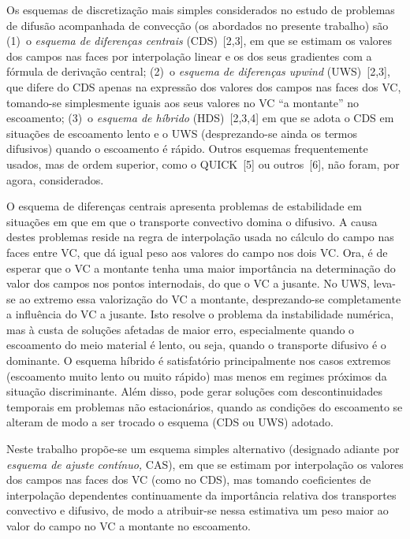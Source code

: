 \documentclass[11pt,twoside]{article}
\begin{document}
{Os esquemas de discretização mais simples considerados no estudo de problemas de
difusão acompanhada de convecção (os abordados no presente trabalho) são (1)~o
\emph{esquema de diferenças centrais} (CDS)~[2,3], em que se estimam os valores
dos campos nas faces por interpolação linear e os dos seus gradientes com a
fórmula de derivação central; (2)~o \emph{esquema de diferenças upwind} (UWS)~[2,3], que difere do CDS apenas na
expressão dos valores dos campos nas faces
dos  VC, tomando-se simplesmente iguais aos seus valores no VC ``a montante''
no escoamento; (3)~o \emph{esquema de híbrido} (HDS)~[2,3,4] em que se adota o
CDS em situações de escoamento lento e o UWS (desprezando-se ainda os termos
difusivos) quando o escoamento é rápido. Outros esquemas frequentemente usados, mas de ordem superior, como o QUICK~[5] ou outros~[6], não foram, por agora, considerados.

O esquema de diferenças centrais apresenta problemas de estabilidade em situações em que em que o transporte
convectivo domina o difusivo. A causa destes problemas reside na regra de interpolação usada no cálculo do campo 
nas faces entre VC, que dá igual peso aos valores do campo nos dois VC. Ora, é de esperar que o VC a montante tenha
uma maior importância na determinação do valor dos campos nos pontos internodais, do que o VC a jusante. No UWS,
leva-se ao extremo essa valorização do VC a montante, desprezando-se completamente a influência do VC a jusante.
Isto resolve o problema da instabilidade numérica, mas à custa de soluções afetadas de maior erro, especialmente
quando o escoamento do meio material é lento, ou seja, quando o  transporte difusivo é o dominante. O
esquema híbrido é satisfatório principalmente nos casos extremos (escoamento muito lento ou muito rápido) mas
menos em regimes próximos da situação discriminante. Além disso, pode gerar soluções com descontinuidades
temporais em problemas não estacionários, quando as condições do escoamento se alteram de modo a ser trocado o
esquema (CDS ou UWS) adotado.

Neste trabalho propõe-se um esquema simples alternativo (designado adiante por \emph{esquema de ajuste
contínuo,} CAS), em que se estimam por interpolação os valores dos campos nas faces dos VC (como no CDS), mas
tomando coeficientes de interpolação dependentes continuamente da importância relativa dos transportes convectivo e
difusivo, de modo a atribuir-se nessa estimativa um peso maior ao valor do campo no VC a montante no escoamento. 


}
\end{document}
